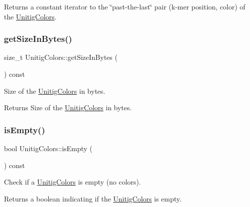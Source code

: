 \begin{DoxyReturn}{Returns}
a constant iterator to the \char`\"{}past-\/the-\/last\char`\"{} pair (k-\/mer position, color) of the \hyperlink{classUnitigColors}{Unitig\+Colors}. 
\end{DoxyReturn}
\mbox{\label{classUnitigColors_af44f80476c0d1764a8b1c5530cf8f42e}} 
\subsubsection{\texorpdfstring{get\+Size\+In\+Bytes()}{getSizeInBytes()}}
{\footnotesize\ttfamily size\+\_\+t Unitig\+Colors\+::get\+Size\+In\+Bytes (\begin{DoxyParamCaption}{ }\end{DoxyParamCaption}) const}



Size of the \hyperlink{classUnitigColors}{Unitig\+Colors} in bytes. 

\begin{DoxyReturn}{Returns}
Size of the \hyperlink{classUnitigColors}{Unitig\+Colors} in bytes. 
\end{DoxyReturn}
\mbox{\label{classUnitigColors_a8211a4472374f696433df782d30a8ee2}} 
\subsubsection{\texorpdfstring{is\+Empty()}{isEmpty()}}
{\footnotesize\ttfamily bool Unitig\+Colors\+::is\+Empty (\begin{DoxyParamCaption}{ }\end{DoxyParamCaption}) const\hspace{0.3cm}{\ttfamily [inline]}}



Check if a \hyperlink{classUnitigColors}{Unitig\+Colors} is empty (no colors). 

\begin{DoxyReturn}{Returns}
a boolean indicating if the \hyperlink{classUnitigColors}{Unitig\+Colors} is empty. 
\end{DoxyReturn}
\mbox{\label{classUnitigColors_a242276ed4b9198fd1718f0c2692af9e5}} 
